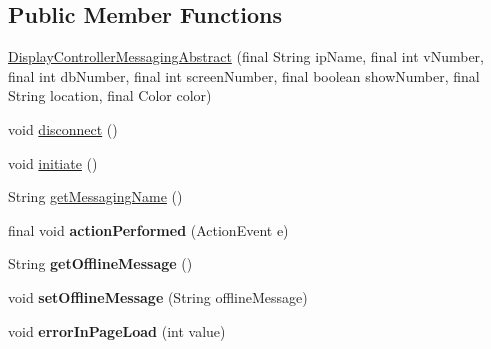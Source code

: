 \subsection*{Public Member Functions}
\begin{DoxyCompactItemize}
\item 
\hyperlink{classgov_1_1fnal_1_1ppd_1_1dd_1_1display_1_1client_1_1DisplayControllerMessagingAbstract_a29d30efd5c44b5ac8ad2044fc8e9209e}{Display\-Controller\-Messaging\-Abstract} (final String ip\-Name, final int v\-Number, final int db\-Number, final int screen\-Number, final boolean show\-Number, final String location, final Color color)
\item 
void \hyperlink{classgov_1_1fnal_1_1ppd_1_1dd_1_1display_1_1client_1_1DisplayControllerMessagingAbstract_ab4669eeb7e29918c88f15ea2afc17604}{disconnect} ()
\item 
void \hyperlink{classgov_1_1fnal_1_1ppd_1_1dd_1_1display_1_1client_1_1DisplayControllerMessagingAbstract_ae25c8ff7cfa18c137ff9b0a04f65fd8c}{initiate} ()
\item 
String \hyperlink{classgov_1_1fnal_1_1ppd_1_1dd_1_1display_1_1client_1_1DisplayControllerMessagingAbstract_a7d2a03dd8cfa663368cbcf67fbcf804e}{get\-Messaging\-Name} ()
\item 
\hypertarget{classgov_1_1fnal_1_1ppd_1_1dd_1_1display_1_1client_1_1DisplayControllerMessagingAbstract_a669e9d8cd86408c7b578c7b5c39650b7}{final void {\bfseries action\-Performed} (Action\-Event e)}\label{classgov_1_1fnal_1_1ppd_1_1dd_1_1display_1_1client_1_1DisplayControllerMessagingAbstract_a669e9d8cd86408c7b578c7b5c39650b7}

\item 
\hypertarget{classgov_1_1fnal_1_1ppd_1_1dd_1_1display_1_1client_1_1DisplayControllerMessagingAbstract_a02fcbfd5923cccc17585007ceb7cc558}{String {\bfseries get\-Offline\-Message} ()}\label{classgov_1_1fnal_1_1ppd_1_1dd_1_1display_1_1client_1_1DisplayControllerMessagingAbstract_a02fcbfd5923cccc17585007ceb7cc558}

\item 
\hypertarget{classgov_1_1fnal_1_1ppd_1_1dd_1_1display_1_1client_1_1DisplayControllerMessagingAbstract_ac134aed7d435082990e7ede49f5a641c}{void {\bfseries set\-Offline\-Message} (String offline\-Message)}\label{classgov_1_1fnal_1_1ppd_1_1dd_1_1display_1_1client_1_1DisplayControllerMessagingAbstract_ac134aed7d435082990e7ede49f5a641c}

\item 
\hypertarget{classgov_1_1fnal_1_1ppd_1_1dd_1_1display_1_1client_1_1DisplayControllerMessagingAbstract_a3d9858154eb1bf65755cf3eab56539ad}{void {\bfseries error\-In\-Page\-Load} (int value)}\label{classgov_1_1fnal_1_1ppd_1_1dd_1_1display_1_1client_1_1DisplayControllerMessagingAbstract_a3d9858154eb1bf65755cf3eab56539ad}

\end{DoxyCompactItemize}
